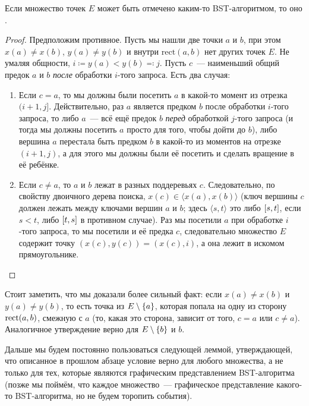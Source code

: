\begin{theorem}\label{bst_to_arbs} Если множество точек $E$ может быть отмечено каким-то BST-алгоритмом,
	то оно \arbs.
\end{theorem}
\begin{proof} Предположим противное. Пусть мы нашли две точки $a$ и $b$, при этом
	$x(a) \neq x(b)$, $y(a) \neq y(b)$ и внутри $\mathrm{rect}(a, b)$ нет других точек $E$.
	Не умаляя общности, $i \coloneqq y(a) < y(b) \eqqcolon j$. Пусть $c$~--- наименьший общий предок $a$ и $b$ \emph{после} обработки $i$-того запроса.
	Есть два случая:
	\begin{enumerate}
		\item Если $c = a$, то мы должны были посетить $a$ в какой-то момент из отрезка $(i + 1, j]$. Действительно, раз $a$ является предком $b$ после обработки $i$-того запроса, то либо $a$~--- всё ещё предок $b$ \emph{перед} обработкой $j$-того запроса (и тогда мы должны посетить $a$ просто для того, чтобы дойти до $b$), либо вершина $a$ перестала быть предком $b$ в какой-то из моментов на отрезке $(i + 1, j)$, а для этого мы должны были её посетить и сделать вращение в её ребёнке.

		\item Если $c \neq a$, то $a$ и $b$ лежат в разных поддеревьях $c$. Следовательно, по свойству двоичного дерева поиска, $x(c) \in \langle x(a), x(b) \rangle$ (ключ вершины $c$ должен лежать между ключами вершин $a$ и $b$; здесь $\langle s, t \rangle$ это либо $[s, t]$, если $s < t$, либо $[t, s]$ в противном случае). Раз мы посетили $a$ при обработке $i$-того
		      запроса, то мы посетили и её предка $c$, следовательно множество $E$ содержит точку $(x(c), y(c)) = (x(c), i)$, а она лежит в искомом прямоугольнике.
	\end{enumerate}
\end{proof}

Стоит заметить, что мы доказали более сильный факт: если $x(a) \neq x(b)$ и $y(a) \neq y(b)$, то есть точка из $E \setminus \lbrace a\rbrace$, которая попала на одну из сторону $\operatorname{rect}(a, b)$, смежную с $a$ (то, какая это сторона, зависит от того, $c = a$ или $c \neq a$). Аналогичное утверждение верно для $E \setminus \lbrace b\rbrace$ и $b$.

Дальше мы будем постоянно пользоваться следующей леммой, утверждающей, что описанное в прошлом абзаце условие верно для любого \arbs множества, а не только для тех, которые
являются графическим представлением BST-алгоритма (позже мы поймём, что каждое
\arbs множество~--- графическое представление какого-то BST-алгоритма, но не будем торопить события).

